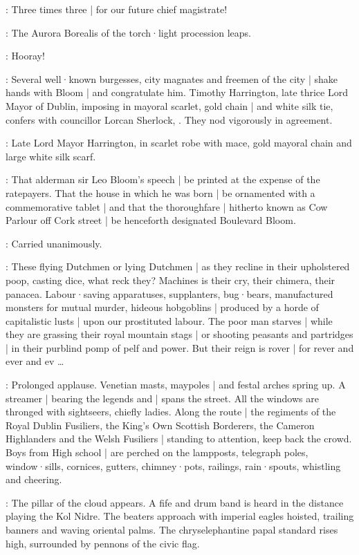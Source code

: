 \Elector:
Three times three |
for our future chief magistrate!

:
The Aurora Borealis of the torch·light procession leaps.

\Torchbearers:
Hooray!

:
Several well·known burgesses,
city magnates and freemen of the city |
shake hands with Bloom |
and congratulate him.
Timothy Harrington,
late thrice Lord Mayor of Dublin,
imposing in mayoral scarlet,
gold chain |
and white silk tie,
confers with councillor Lorcan Sherlock,
.
They nod vigorously in agreement.

:
Late Lord Mayor Harrington,
in scarlet robe with mace,
gold mayoral chain and large white silk scarf.

\Harrington:
That alderman sir Leo Bloom's speech |
be printed at the expense of the ratepayers.
That the house in which he was born |
be ornamented with a commemorative tablet |
and that the thoroughfare |
hitherto known as Cow Parlour off Cork street |
be henceforth designated Boulevard Bloom.

\Lorcan[2]:
Carried unanimously.

\Bloom:
These flying Dutchmen or lying Dutchmen |
as they recline in their upholstered poop,
casting dice,
what reck they?
Machines is their cry,
their chimera,
their panacea.
Labour·saving apparatuses,
supplanters,
bug·bears,
manufactured monsters for mutual murder,
hideous hobgoblins |
produced by a horde of capitalistic lusts |
upon our prostituted labour.
The poor man starves |
while they are grassing their royal mountain stags |
or shooting peasants and partridges |
in their purblind pomp of pelf and power.
But their reign is rover |
for rever and ever and ev \ldots

:
Prolonged applause.
Venetian masts,
maypoles |
and festal arches spring up.
A streamer |
bearing the legends 
and  |
spans the street.
All the windows are thronged with sightseers,
chiefly ladies.
Along the route |
the regiments of the Royal Dublin Fusiliers,
the King's Own Scottish Borderers,
the Cameron Highlanders
and the Welsh Fusiliers |
standing to attention,
keep back the crowd.
Boys from High school |
are perched on the lampposts,
telegraph poles,
window·sills,
cornices,
gutters,
chimney·pots,
railings,
rain·spouts,
whistling and cheering.

:
The pillar of the cloud appears.
A fife and drum band is heard in the distance playing the Kol Nidre.
The beaters approach with imperial eagles hoisted,
trailing banners and waving oriental palms.
The chryselephantine papal standard rises high,
surrounded by pennons of the civic flag.

